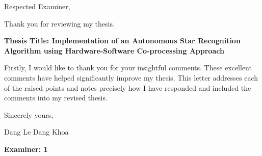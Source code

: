 \documentclass[dvips,a4paper,12pt]{article}
\begin{document}


\noindent Respected Examiner,

\noindent Thank you for reviewing my thesis.

\begin{center}
    \textbf{Thesis Title: Implementation of an Autonomous Star Recognition Algorithm using Hardware-Software Co-processing Approach} 
\end{center}

\noindent Firstly, I would like to thank you for your insightful comments. These excellent comments have helped significantly improve my thesis. This letter addresses each of the raised points and notes precisely how I have responded and included the comments into my revised thesis. \\

\vspace{0.5in}

\noindent Sincerely yours,

\noindent Dang Le Dang Khoa

\newpage

\color{blue}
\noindent \large{\textbf{Examiner: 1}}
\end{document}
